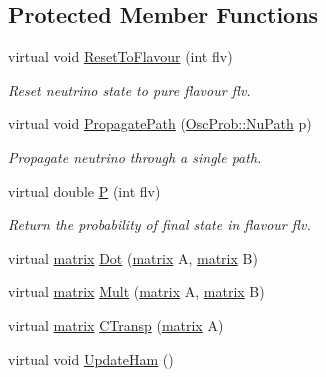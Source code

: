 \subsection*{Protected Member Functions}
\begin{DoxyCompactItemize}
\item 
virtual void \hyperlink{classOscProb_1_1PMNS__Deco_a393940f176614e3ffebeea40cfe78a62}{Reset\+To\+Flavour} (int flv)
\begin{DoxyCompactList}\small\item\em Reset neutrino state to pure flavour flv. \end{DoxyCompactList}\item 
virtual void \hyperlink{classOscProb_1_1PMNS__Deco_aa75341a3608bb12d7792a14e67ef2d5e}{Propagate\+Path} (\hyperlink{structOscProb_1_1NuPath}{Osc\+Prob\+::\+Nu\+Path} p)
\begin{DoxyCompactList}\small\item\em Propagate neutrino through a single path. \end{DoxyCompactList}\item 
virtual double \hyperlink{classOscProb_1_1PMNS__Deco_aa81f47ea36207b90a5feb9849060032d}{P} (int flv)
\begin{DoxyCompactList}\small\item\em Return the probability of final state in flavour flv. \end{DoxyCompactList}\item 
virtual \hyperlink{classOscProb_1_1PMNS__Deco_a77b4e0c041b6268910a270be0f5387c9}{matrix} \hyperlink{classOscProb_1_1PMNS__Deco_a8d6b547de294c0d52d4208bde44fe171}{Dot} (\hyperlink{classOscProb_1_1PMNS__Deco_a77b4e0c041b6268910a270be0f5387c9}{matrix} A, \hyperlink{classOscProb_1_1PMNS__Deco_a77b4e0c041b6268910a270be0f5387c9}{matrix} B)
\item 
virtual \hyperlink{classOscProb_1_1PMNS__Deco_a77b4e0c041b6268910a270be0f5387c9}{matrix} \hyperlink{classOscProb_1_1PMNS__Deco_aacc9909556ca22aca30620893e12b0db}{Mult} (\hyperlink{classOscProb_1_1PMNS__Deco_a77b4e0c041b6268910a270be0f5387c9}{matrix} A, \hyperlink{classOscProb_1_1PMNS__Deco_a77b4e0c041b6268910a270be0f5387c9}{matrix} B)
\item 
virtual \hyperlink{classOscProb_1_1PMNS__Deco_a77b4e0c041b6268910a270be0f5387c9}{matrix} \hyperlink{classOscProb_1_1PMNS__Deco_aca391ff02be7abc2fd3dba40e9ce2665}{C\+Transp} (\hyperlink{classOscProb_1_1PMNS__Deco_a77b4e0c041b6268910a270be0f5387c9}{matrix} A)
\item 
virtual void \hyperlink{classOscProb_1_1PMNS__Fast_a16248082308f9d2c332ebf1be0aa90c3}{Update\+Ham} ()

\end{DoxyCompactItemize}
